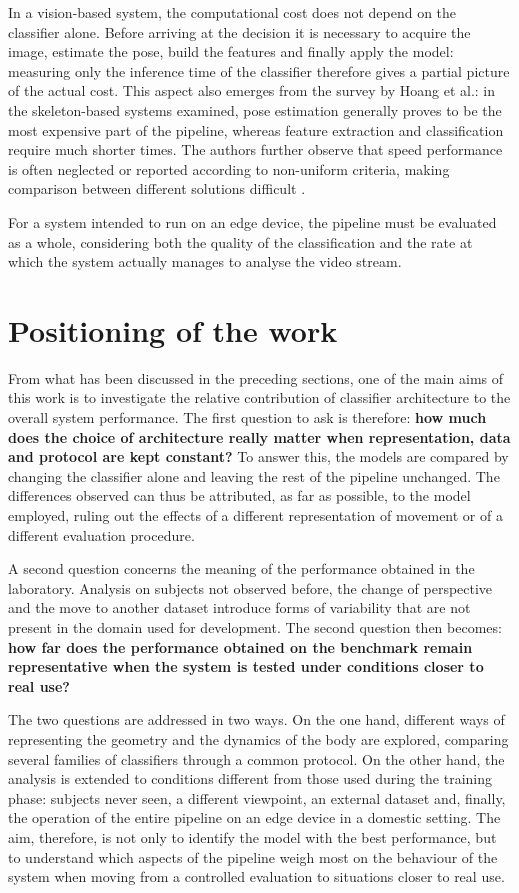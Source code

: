 In a vision-based system, the computational cost does not depend on the classifier alone. Before arriving at the decision it is necessary to acquire the image, estimate the pose, build the features and finally apply the model: measuring only the inference time of the classifier therefore gives a partial picture of the actual cost. This aspect also emerges from the survey by Hoang et al.: in the skeleton-based systems examined, pose estimation generally proves to be the most expensive part of the pipeline, whereas feature extraction and classification require much shorter times. The authors further observe that speed performance is often neglected or reported according to non-uniform criteria, making comparison between different solutions difficult \cite{HO}.

For a system intended to run on an edge device, the pipeline must be evaluated as a whole, considering both the quality of the classification and the rate at which the system actually manages to analyse the video stream. 

\section{Positioning of the work}

From what has been discussed in the preceding sections, one of the main aims of this work is to investigate the relative contribution of classifier architecture to the overall system performance.
The first question to ask is therefore: \textbf{how much does the choice of architecture really matter when representation, data and protocol are kept constant?}
To answer this, the models are compared by changing the classifier alone and leaving the rest of the pipeline unchanged. The differences observed can thus be attributed, as far as possible, to the model employed, ruling out the effects of a different representation of movement or of a different evaluation procedure.

A second question concerns the meaning of the performance obtained in the laboratory. Analysis on subjects not observed before, the change of perspective and the move to another dataset introduce forms of variability that are not present in the domain used for development.
The second question then becomes: \textbf{how far does the performance obtained on the benchmark remain representative when the system is tested under conditions closer to real use?}

The two questions are addressed in two ways. On the one hand, different ways of representing the geometry and the dynamics of the body are explored, comparing several families of classifiers through a common protocol. On the other hand, the analysis is extended to conditions different from those used during the training phase: subjects never seen, a different viewpoint, an external dataset and, finally, the operation of the entire pipeline on an edge device in a domestic setting. The aim, therefore, is not only to identify the model with the best performance, but to understand which aspects of the pipeline weigh most on the behaviour of the system when moving from a controlled evaluation to situations closer to real use.
